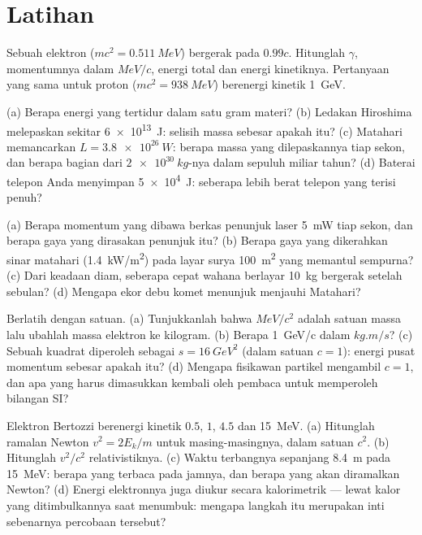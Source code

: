 \section{Latihan}

\begin{exercise}[$\star$]\label{exo:b3:relativistic-dynamics:1}
Sebuah elektron ($mc^2 = \qty{0.511}{MeV}$) bergerak pada $0.99c$.
Hitunglah $\gamma$, momentumnya dalam $\unit{MeV}/c$, energi total dan
energi kinetiknya. Pertanyaan yang sama untuk proton ($mc^2 = \qty{938}{MeV}$)
berenergi kinetik \qty{1}{GeV}.
\end{exercise}

\begin{exercise}[$\star$]\label{exo:b3:relativistic-dynamics:2}
(a) Berapa energi yang tertidur dalam satu gram materi? (b) Ledakan
Hiroshima melepaskan sekitar \qty{6e13}{J}: selisih massa sebesar apakah
itu? (c) Matahari memancarkan $L = \qty{3.8e26}{W}$: berapa massa yang
dilepaskannya tiap sekon, dan berapa bagian dari $\qty{2e30}{kg}$-nya
dalam sepuluh miliar tahun? (d) Baterai telepon Anda menyimpan
\qty{5e4}{J}: seberapa lebih berat telepon yang terisi penuh?
\end{exercise}

\begin{exercise}[$\star$]\label{exo:b3:relativistic-dynamics:3}
(a) Berapa momentum yang dibawa berkas penunjuk laser \qty{5}{mW} tiap
sekon, dan berapa gaya yang dirasakan penunjuk itu? (b) Berapa gaya yang
dikerahkan sinar matahari (\qty{1.4}{kW/m^2}) pada layar surya
\qty{100}{m^2} yang memantul sempurna? (c) Dari keadaan diam, seberapa
cepat wahana berlayar \qty{10}{kg} bergerak setelah sebulan? (d) Mengapa
ekor debu komet menunjuk menjauhi Matahari?
\end{exercise}

\begin{exercise}[$\star$]\label{exo:b3:relativistic-dynamics:4}
Berlatih dengan satuan. (a) Tunjukkanlah bahwa $\unit{MeV}/c^2$ adalah
satuan massa lalu ubahlah massa elektron ke kilogram. (b) Berapa
\qty{1}{GeV/c} dalam $\unit{kg.m/s}$? (c) Sebuah kuadrat 
diperoleh sebagai $s = \qty{16}{GeV^2}$ (dalam satuan $c = 1$): energi
pusat momentum sebesar apakah itu? (d) Mengapa fisikawan partikel
mengambil $c = 1$, dan apa yang harus dimasukkan kembali oleh pembaca
untuk memperoleh bilangan SI?
\end{exercise}

\begin{exercise}[$\star\star$]\label{exo:b3:relativistic-dynamics:5}
Elektron Bertozzi berenergi kinetik $0.5$, $1$, $4.5$ dan
\qty{15}{MeV}. (a) Hitunglah ramalan Newton $v^2 = 2E_k/m$ untuk
masing-masingnya, dalam satuan $c^2$. (b) Hitunglah $v^2/c^2$
relativistiknya. (c) Waktu terbangnya sepanjang \qty{8.4}{m} pada
\qty{15}{MeV}: berapa yang terbaca pada jamnya, dan berapa yang akan
diramalkan Newton? (d) Energi elektronnya juga diukur secara
kalorimetrik --- lewat kalor yang ditimbulkannya saat menumbuk: mengapa
langkah itu merupakan inti sebenarnya percobaan tersebut?
\end{exercise}


